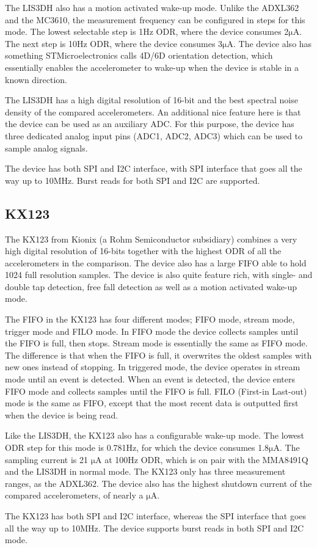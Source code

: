 The LIS3DH also has a motion activated wake-up mode. Unlike the ADXL362 and the MC3610, the measurement frequency can be configured in steps for this mode. The lowest selectable step is 1Hz ODR, where the device consumes 2$\si{\micro\ampere}$. The next step is 10Hz ODR, where the device consumes 3$\si{\micro\ampere}$. The device also has something STMicroelectronics calls 4D/6D orientation detection, which essentially enables the accelerometer to wake-up when the device is stable in a known direction. 

The LIS3DH has a high digital resolution of 16-bit and the best spectral noise density of the compared accelerometers. An additional nice feature here is that the device can be used as an auxiliary ADC. For this purpose, the device has three dedicated analog input pins (ADC1, ADC2, ADC3) which can be used to sample analog signals. 

The device has both SPI and I2C interface, with SPI interface that goes all the way up to 10MHz. Burst reads for both SPI and I2C are supported.

\subsection{KX123}

The KX123 from Kionix (a Rohm Semiconductor subsidiary) combines a very high digital resolution of 16-bits together with the highest ODR of all the accelerometers in the comparison. The device also has a large FIFO able to hold 1024 full resolution samples. The device is also quite feature rich, with single- and double tap detection, free fall detection as well as a motion activated wake-up mode.

The FIFO in the KX123 has four different modes; FIFO mode, stream mode, trigger mode and FILO mode. In FIFO mode the device collects samples until the FIFO is full, then stops. Stream mode is essentially the same as FIFO mode. The difference is that when the FIFO is full, it overwrites the oldest samples with new ones instead of stopping. In triggered mode, the device operates in stream mode until an event is detected. When an event is detected, the device enters FIFO mode and collects samples until the FIFO is full. FILO (First-in Last-out) mode is the same as FIFO, except that the most recent data is outputted first when the device is being read.

Like the LIS3DH, the KX123 also has a configurable wake-up mode. The lowest ODR step for this mode is 0.781Hz, for which the device consumes 1.8$\si{\micro\ampere}$. The sampling current is 21 $\si{\micro\ampere}$ at 100Hz ODR, which is on pair with the MMA8491Q and the LIS3DH in normal mode. The KX123 only has three measurement ranges, as the ADXL362. The device also has the highest shutdown current of the compared accelerometers, of nearly a $\si{\micro\ampere}$. 

The KX123 has both SPI and I2C interface, whereas the SPI interface that goes all the way up to 10MHz. The device supports burst reads in both SPI and I2C mode.